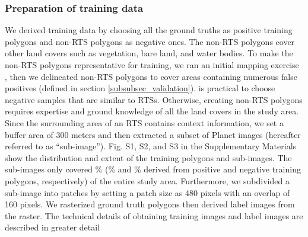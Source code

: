 \documentclass[authoryear,preprint,review,12pt]{elsarticle}
\begin{document}
\subsubsection{Preparation of training data}
\label{subsubsec_pre_trainingdata}

We derived training data by choosing all the ground truths as positive training polygons and  non-RTS polygons as negative ones. The non-RTS polygons cover other land covers such as vegetation, bare land, and water bodies. To make the non-RTS polygons representative for training, we ran an initial mapping exercise , then we delineated non-RTS polygons to cover areas containing numerous false positives (defined in section \ref{subsubsec_validation}).  is practical to choose negative samples that are similar to RTSs. Otherwise, creating non-RTS polygons requires expertise and ground knowledge of all the land covers in the study area. Since the surrounding area of an RTS contains context information, we set a buffer area of 300 meters and then extracted a subset of Planet images (hereafter referred to as “sub-image”). Fig. S1, S2, and S3 in the Supplementary Materials show the distribution and extent of the training polygons and sub-images. The sub-images only covered \% (\% and \% derived from positive and negative training polygons, respectively) of the entire study area. Furthermore, we subdivided a sub-image into patches by setting a patch size as 480 pixels with an overlap of 160 pixels.  We rasterized ground truth polygons then derived label images from the raster. The technical details of obtaining training images and label images are described in greater detail   
\end{document}
